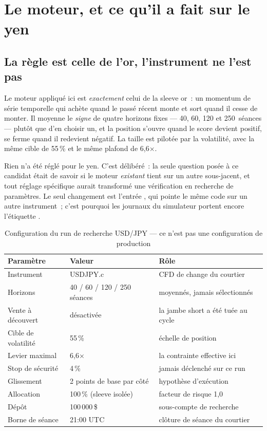 \section{Le moteur, et ce qu'il a fait sur le yen}

\subsection{La règle est celle de l'or, l'instrument ne l'est pas}

Le moteur appliqué ici est \emph{exactement} celui de la sleeve or~: un
momentum de série temporelle qui achète quand le passé récent monte et sort
quand il cesse de monter. Il moyenne le \emph{signe} de quatre horizons fixes
--- 40, 60, 120 et 250~séances --- plutôt que d'en choisir un, et la position
s'ouvre quand le score devient positif, se ferme quand il redevient négatif. La
taille est pilotée par la volatilité, avec la même cible de 55\,\% et le même
plafond de 6,6$\times$.

Rien n'a été réglé pour le yen. C'est délibéré~: la seule question posée à ce
candidat était de savoir si le moteur \emph{existant} tient sur un autre
sous-jacent, et tout réglage spécifique aurait transformé une vérification en
recherche de paramètres. Le seul changement est l'entrée
, qui pointe le même code sur un autre
instrument~; c'est pourquoi les journaux du simulateur portent encore
l'étiquette .

\begin{table}[H]
\centering
\begin{tabular}{@{}lll@{}}
\toprule
Paramètre & Valeur & Rôle \\
\midrule
Instrument        & USDJPY.c                     & CFD de change du courtier \\
Horizons          & 40 / 60 / 120 / 250 séances  & moyennés, jamais sélectionnés \\
Vente à découvert & désactivée                   & la jambe short a été tuée au cycle \\
Cible de volatilité & 55\,\%                     & échelle de position \\
Levier maximal    & 6,6$\times$                  & la contrainte effective ici \\
Stop de sécurité  & 4\,\%                        & jamais déclenché sur ce run \\
Glissement        & 2 points de base par côté    & hypothèse d'exécution \\
Allocation        & 100\,\% (sleeve isolée)      & facteur de risque 1,0 \\
Dépôt             & 100\,000\,\$                 & sous-compte de recherche \\
Borne de séance   & 21{:}00 UTC                  & clôture de séance du courtier \\
\bottomrule
\end{tabular}
\caption{Configuration du run de recherche USD/JPY --- ce n'est pas une
configuration de production}
\end{table}

